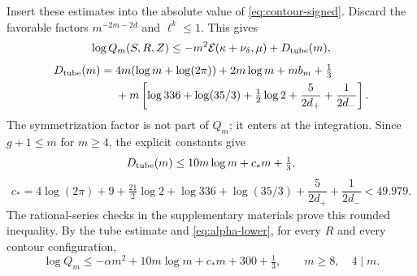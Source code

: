Insert these estimates into the absolute value of
\eqref{eq:contour-signed}. Discard the favorable factors \(m^{-2m-2d}\) and
\(\ell^k\le1\). This gives
\[
 \log Q_m(S,R,Z)\le
      -m^2\mathcal E(\kappa+\nu_\delta,\mu)+D_{\rm tube}(m),
\]
\[
\begin{split}
 D_{\rm tube}(m)={}&4m(\log m+\log(2\pi))+2m\log m+mb_m+\tfrac13\\
 &+m\left[\log336+\log(35/3)+\tfrac12\log2
                            +\frac5{2d_+}+\frac1{2d_-}\right].
\end{split}
\]
The symmetrization factor is not part of \(Q_m\); it enters at the
integration. Since \(g+1\le m\) for \(m\ge4\), the explicit constants give
\[
 D_{\rm tube}(m)\le10m\log m+c_*m+\tfrac13,
\]
\begin{equation}\label{eq:config-cstar}
 c_*=4\log(2\pi)+9+\tfrac{21}{2}\log2+
         \log336+\log(35/3)+\frac5{2d_+}+\frac1{2d_-}
       <49.979.
\end{equation}
The rational-series checks in the supplementary materials prove this
rounded inequality. By the tube estimate and \eqref{eq:alpha-lower}, for
every \(R\) and every contour configuration,
\begin{equation}\label{eq:config-final}
 \log Q_m\le-\alpha m^2+10m\log m+c_*m+300+\tfrac13,
       \qquad m\ge8,\quad4\mid m.
\end{equation}
